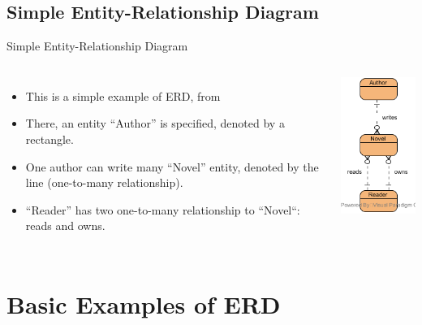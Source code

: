 \documentclass{beamer}
\begin{document}
	\subsection{Simple Entity-Relationship Diagram}
	\begin{frame}{Simple Entity-Relationship Diagram}
		\begin{columns}[t,totalwidth=\textwidth]
				\begin{itemize}
					\item This is a simple example of ERD, from \cite{Schach:2006:OCS:1207045}
					\item There, an entity ``Author'' is specified, denoted by a rectangle.
					\item One author can write many ``Novel'' entity, denoted by the line (one-to-many relationship).
					\item ``Reader'' has two one-to-many relationship to ``Novel``: reads and owns.
				\end{itemize}
				\begin{flushright}
					\includegraphics[scale=0.7]{img/02_simple_erd}
				\end{flushright}
		\end{columns}
	\end{frame}
	
	\section{Basic Examples of ERD}
\end{document}
